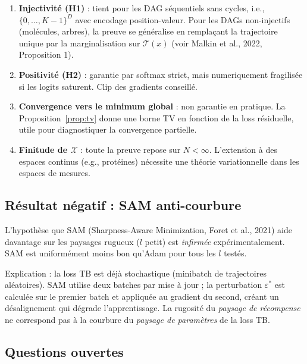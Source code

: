 \documentclass[11pt,a4paper]{article}
\theoremstyle{plain}
\theoremstyle{definition}
\theoremstyle{remark}
\newcommand{\calX}{\mathcal{X}}
\newcommand{\calT}{\mathcal{T}}
\begin{document}
\begin{enumerate}
  \item \textbf{Injectivité (H1)} : tient pour les DAG séquentiels sans cycles,
  i.e., $\{0,\ldots,K-1\}^D$ avec encodage position-valeur.
  Pour les DAGs non-injectifs (molécules, arbres), la preuve se généralise
  en remplaçant la trajectoire unique par la marginalisation sur $\calT(x)$
  (voir Malkin et al., 2022, Proposition 1).

  \item \textbf{Positivité (H2)} : garantie par softmax strict, mais numeriquement
  fragilisée si les logits saturent. Clip des gradients conseillé.

  \item \textbf{Convergence vers le minimum global} : non garantie en pratique.
  La Proposition~\ref{prop:tv} donne une borne TV en fonction de la loss résiduelle,
  utile pour diagnostiquer la convergence partielle.

  \item \textbf{Finitude de $\calX$} : toute la preuve repose sur $N < \infty$.
  L'extension à des espaces continus (e.g., protéines) nécessite une théorie variationnelle
  dans les espaces de mesures.
\end{enumerate}

\subsection{Résultat négatif : SAM anti-courbure}

L'hypothèse que SAM (Sharpness-Aware Minimization, Foret et al., 2021)
aide davantage sur les paysages rugueux ($l$ petit) est \emph{infirmée} expérimentalement.
SAM est uniformément moins bon qu'Adam pour tous les $l$ testés.

Explication : la loss TB est déjà stochastique (minibatch de trajectoires aléatoires).
SAM utilise deux batches par mise à jour ; la perturbation $\varepsilon^*$ est calculée
sur le premier batch et appliquée au gradient du second, créant un désalignement qui
dégrade l'apprentissage. La rugosité du \emph{paysage de récompense} ne correspond
pas à la courbure du \emph{paysage de paramètres} de la loss TB.

\subsection{Questions ouvertes}
\end{document}
